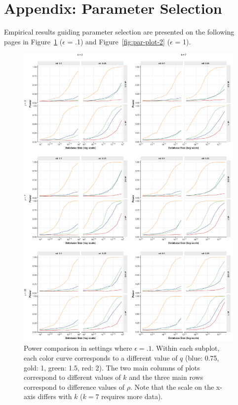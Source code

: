 \documentclass[USenglish,oneside]{article}
\newcounter{ag}
\newcounter{ab}
\newcounter{ar}
\begin{document}
\section{Appendix: Parameter Selection}
\label{Sec:AppOptPars}

Empirical results guiding parameter selection are presented on the following
pages in Figure~\ref{fig:par-plot-1} ($\epsilon$ = .1) and Figure~\ref{fig:par-plot-2} 
($\epsilon$ = 1). 

\begin{figure}[h]
\centering
\includegraphics[width=\linewidth]{images/par-plot-1.png}
\caption{Power comparison in settings where $\epsilon = .1$. Within each subplot,
each color curve corresponds to a different value of $q$ (blue: 0.75, gold: 1,
green: 1.5, red: 2). The two main columns
of plots correspond to different values of $k$ and the three main rows correspond
to difference values of $\rho$. Note that the scale on the x-axis differs with $k$
($k = 7$ requires more data).}\label{fig:par-plot-1}
\end{figure}
\end{document}
